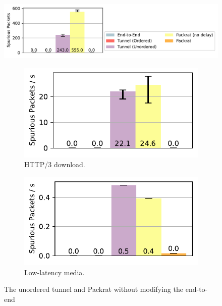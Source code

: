 \begin{figure}[ht]
\centering
\begin{minipage}[t]{0.3\textwidth}
    \includegraphics[width=\linewidth, trim=245 15 5 65, clip]{packrat-paper/figures/spurious_retx_legend.pdf}
    \begin{subfigure}[b]{\linewidth}
        \includegraphics[width=\linewidth]{packrat-paper/figures/spurious_retx_http.pdf}
        \caption{HTTP/3 download.}
        \label{fig:http:spurious}
    \end{subfigure}
    \begin{subfigure}[b]{\linewidth}
        \includegraphics[width=\linewidth]{packrat-paper/figures/spurious_retx_media.pdf}
        \caption{Low-latency media.}
        \label{fig:media:spurious}
    \end{subfigure}
    \caption{The unordered tunnel and Packrat without modifying the end-to-end
}
\end{minipage}
\end{figure}
